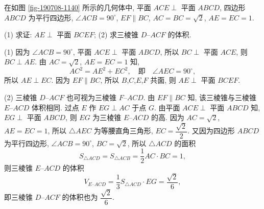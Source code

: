 \begin{exercise}
    在如图 \ref{fig-190708-1140} 所示的几何体中, 平面 $ACE\perp$ 平面 $ABCD$, 四边形 $ABCD$ 为平行四边形, $\angle ACB=90^\circ$, $EF\parallel BC$, $AC=BC=\sqrt2$, $AE=EC=1$.
    
    (1) 求证: $AE\perp$ 平面 $BCEF$;\qquad
    (2) 求三棱锥 $D\text{--}ACF$ 的体积.
\end{exercise}
\beginsolution
    (1) 因为 $\angle ACB=90^\circ$, 平面 $ACE\perp$ 平面 $ABCD$, 所以 $BC\perp$ 平面 $ACE$, 则 $BC\perp AE$. 由  $AC=\sqrt2$, $AE=EC=1$ 知,
    \[AC^2= AE^2+EC^2,\quad\text{即}\quad 
        \angle AEC= 90^\circ,\]
    所以 $AE\perp EC$. 因为 $EF\parallel BC$, 所以 $B$,$C$,$E$,$F$ 共面, 则 $AE\perp$ 平面 $BCEF$.

    (2) 三棱锥 $D\text{--}ACF$ 也可视为三棱锥 $F\text{--}ACD$. 由 $EF\parallel BC$ 知, 该三棱锥与三棱锥 $E\text{--}ACD$ 体积相同. 过点 $E$ 作 $EG\perp AC$ 于点 $G$. 由平面 $ACE\perp$ 平面 $ABCD$ 知, $EG\perp$ 平面 $ABCD$, 则 $EG$ 为三棱锥 $E\text{--}ACD$ 的高. 因为 $AC=\sqrt2$, $AE=EC=1$, 所以 $\triangle AEC$ 为等腰直角三角形, $EC= \dfrac{\sqrt2}2$. 又因为四边形 $ABCD$ 为平行四边形, $\angle ACB= 90^\circ$, $BC=\sqrt2$, 所以 $\triangle ACD$ 的面积
    \[S_{\triangle ACD}= S_{\triangle ACB}
        = \frac12AC\cdot BC= 1,\]
    则三棱锥 $E\text{--}ACD$ 的体积
    \[V_{E\text{--}ACD}= \frac13S_{\triangle ACD}\cdot EG
        = \frac{\sqrt2}6,\]
    即三棱锥 $D\text{--}ACF$ 的体积也为 $\dfrac{\sqrt2}6$.
\endsolution

